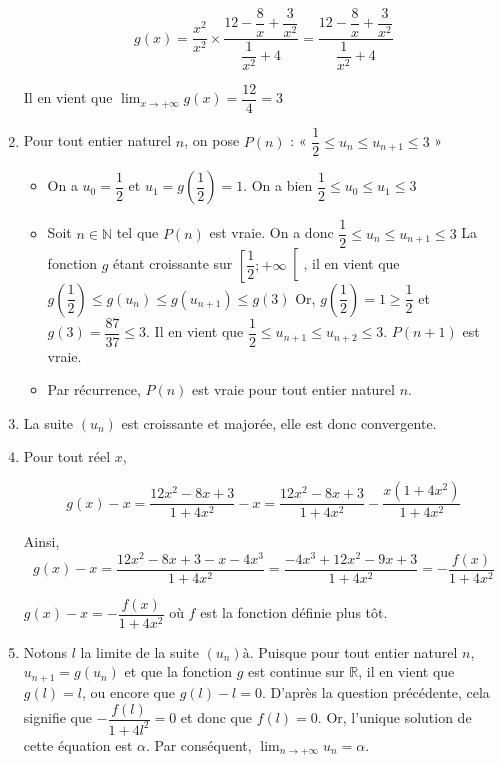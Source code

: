 \documentclass[11pt,fleqn, openany]{book} %
\begin{document}
\begin{solution}
\begin{enumerate}
\[g(x)=\dfrac{x^2}{x^2} \times \dfrac{12-\dfrac{8}{x}+\dfrac{3}{x^2}}{\dfrac{1}{x^2}+4} = \dfrac{12-\dfrac{8}{x}+\dfrac{3}{x^2}}{\dfrac{1}{x^2}+4}\]

 Il en vient que $\displaystyle\lim_{x \to + \infty}g(x) = \dfrac{12}{4}= 3$
\vskip5pt
\item Pour tout entier naturel $n$, on pose $P(n)$ : « $\dfrac{1}{2} \leqslant u_n \leqslant u_{n+1} \leqslant 3$ »
\begin{itemize}
\item On a $u_0= \dfrac{1}{2}$ et $u_1 = g\left(\dfrac{1}{2}\right)=1$. On a bien $\dfrac{1}{2} \leqslant u_0 \leqslant u_{1} \leqslant 3$
\item Soit $n\in\mathbb{N}$ tel que $P(n)$ est vraie. On a donc $\dfrac{1}{2} \leqslant u_n \leqslant u_{n+1} \leqslant 3$
La fonction $g$ étant croissante sur $\left[\dfrac{1}{2} ; + \infty \right[$, il en vient que $g\left(\dfrac{1}{2}\right) \leqslant g(u_n) \leqslant g(u_{n+1}) \leqslant g(3)$
Or, $g\left(\dfrac{1}{2}\right)=1 \geqslant \dfrac{1}{2}$ et $g(3) = \dfrac{87}{37} \leqslant 3$. Il en vient que $\dfrac{1}{2} \leqslant u_{n+1} \leqslant u_{n+2} \leqslant 3$. $P(n+1)$ est vraie.
\item Par récurrence, $P(n)$ est vraie pour tout entier naturel $n$.
\end{itemize}
\vskip5pt
\item La suite $(u_n)$ est croissante et majorée, elle est donc convergente.
\vskip5pt
\item Pour tout réel $x$, 

\[g(x)-x=\dfrac{12x^2-8x+3}{1+4x^2}-x=\dfrac{12x^2-8x+3}{1+4x^2}-\dfrac{x(1+4x^2)}{1+4x^2}\]

Ainsi,
\[g(x)-x=\dfrac{12x^2-8x+3-x-4x^3}{1+4x^2}=\dfrac{-4x^3+12x^2-9x+3}{1+4x^2}=-\dfrac{f(x)}{1+4x^2}\]

$g(x)-x=-\dfrac{f(x)}{1+4x^2}$ où $f$ est la fonction définie plus tôt.
\vskip5pt
\item Notons $l$ la limite de la suite $(u_n)à$. Puisque pour tout entier naturel $n$, $u_{n+1}=g(u_n)$ et que la fonction $g$ est continue sur $\mathbb{R}$, il en vient que $g(l)=l$, ou encore que $g(l)-l=0$. D'après la question précédente, cela signifie que $-\dfrac{f(l)}{1+4l^2}=0$ et donc que $f(l)=0$. Or, l'unique solution de cette équation est $\alpha$. Par conséquent, $\displaystyle \lim _{n \to + \infty}u_n = \alpha$.
\end{enumerate}\end{solution}
\end{document}
